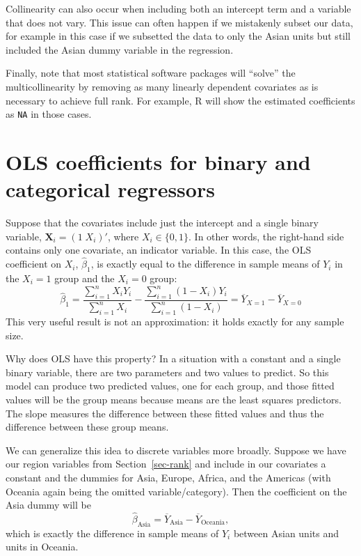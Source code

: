\documentclass[
  13pt,
  letterpaper,
  DIV=11,
  numbers=noendperiod]{scrreprt}
\newcommand{\mb}{\bm}
\newcommand{\X}{\mb{X}}
\theoremstyle{plain}
\theoremstyle{plain}
\theoremstyle{definition}
\theoremstyle{definition}
\theoremstyle{remark}
\begin{document}
Collinearity can also occur when including both an intercept term and a
variable that does not vary. This issue can often happen if we
mistakenly subset our data, for example in this case if we subsetted the
data to only the Asian units but still included the Asian dummy variable
in the regression.

Finally, note that most statistical software packages will ``solve'' the
multicollinearity by removing as many linearly dependent covariates as
is necessary to achieve full rank. For example, R will show the
estimated coefficients as \texttt{NA} in those cases.

\section{OLS coefficients for binary and categorical
regressors}\label{ols-coefficients-for-binary-and-categorical-regressors}

Suppose that the covariates include just the intercept and a single
binary variable, \(\X_i = (1\; X_{i})'\), where \(X_i \in \{0,1\}\). In
other words, the right-hand side contains only one covariate, an
indicator variable. In this case, the OLS coefficient on \(X_i\),
\(\widehat{\beta}_{1}\), is exactly equal to the difference in sample
means of \(Y_i\) in the \(X_i = 1\) group and the \(X_i = 0\) group: \[ 
\widehat{\beta}_{1} = \frac{\sum_{i=1}^{n} X_{i}Y_{i}}{\sum_{i=1}^{n} X_{i}} - \frac{\sum_{i=1}^{n} (1 - X_{i})Y_{i}}{\sum_{i=1}^{n} (1- X_{i})} = \overline{Y}_{X =1} - \overline{Y}_{X=0}
\] This very useful result is not an approximation: it holds exactly for
any sample size.

Why does OLS have this property? In a situation with a constant and a
single binary variable, there are two parameters and two values to
predict. So this model can produce two predicted values, one for each
group, and those fitted values will be the group means because means are
the least squares predictors. The slope measures the difference between
these fitted values and thus the difference between these group means.

We can generalize this idea to discrete variables more broadly. Suppose
we have our region variables from Section~\ref{sec-rank} and include in
our covariates a constant and the dummies for Asia, Europe, Africa, and
the Americas (with Oceania again being the omitted variable/category).
Then the coefficient on the Asia dummy will be \[ 
\widehat{\beta}_{\text{Asia}} = \overline{Y}_{\text{Asia}} - \overline{Y}_{\text{Oceania}},
\] which is exactly the difference in sample means of \(Y_i\) between
Asian units and units in Oceania.
\end{document}
